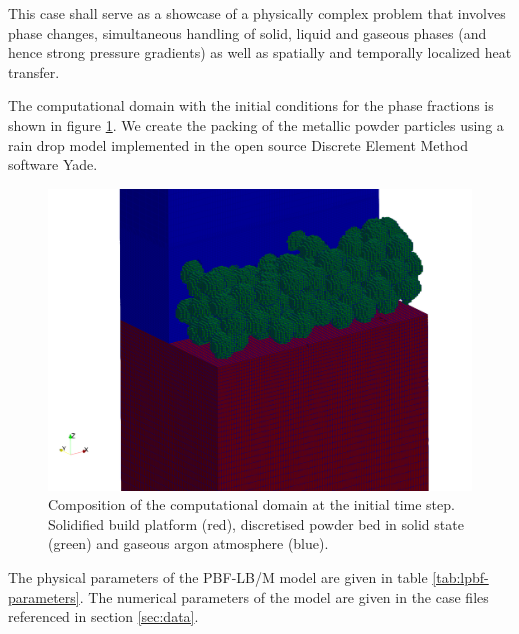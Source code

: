 \documentclass[conference,final]{IEEEtran}
\begin{document}
This case shall serve as a showcase of a physically complex problem that involves phase changes, simultaneous handling of solid, liquid and gaseous phases (and hence strong pressure gradients) as well as spatially and temporally localized heat transfer.

The computational domain with the initial conditions for the phase fractions is shown in figure \ref{fig:lpbf-initial}. We create the packing of the metallic powder particles using a rain drop model implemented in the open source Discrete Element Method software Yade.

\begin{figure}[!tbp]
  \centering
  \includegraphics[width=\linewidth]{Figs/powderbed.png}
  \caption{Composition of the computational domain at the initial time step. Solidified build platform (red), discretised powder bed in solid state (green) and gaseous argon atmosphere (blue).}
  \label{fig:lpbf-initial}
\end{figure}


The physical parameters of the PBF-LB/M model are given in table \ref{tab:lpbf-parameters}. The numerical parameters of the model are given in the case files referenced in section \ref{sec:data}.
\end{document}
